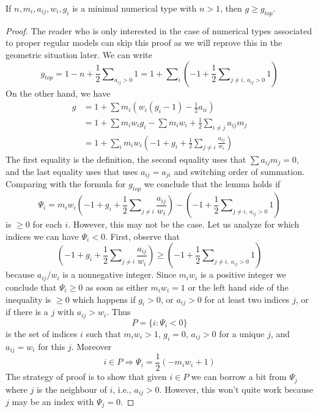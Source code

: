 %
\begin{lemma}
\label{lemma-genus-nonnegative}
If $n, m_i, a_{ij}, w_i, g_i$ is a minimal numerical type
with $n > 1$, then $g \geq g_{top}$.
\end{lemma}

\begin{proof}
The reader who is only interested in the case of numerical types
associated to proper regular models can skip this proof as we will
reprove this in the geometric situation later.
We can write
$$
g_{top} = 1 - n + \frac{1}{2}\sum\nolimits_{a_{ij} > 0} 1 =
1 + \sum\nolimits_i (-1 +
\frac{1}{2}\sum\nolimits_{j \not = i,\ a_{ij} > 0} 1) 
$$
On the other hand, we have
\begin{align*}
g & =
1 + \sum m_i(w_i(g_i - 1) - \frac{1}{2} a_{ii}) \\
& =
1 + \sum m_iw_ig_i - \sum m_iw_i +
\frac{1}{2} \sum\nolimits_{i \not = j} a_{ij}m_j \\
& =
1 + \sum\nolimits_i
m_iw_i(-1 + g_i + \frac{1}{2} \sum\nolimits_{j \not = i} \frac{a_{ij}}{w_i})
\end{align*}
The first equality is the definition, the second equality uses that
$\sum a_{ij}m_j = 0$, and the last equality uses that
uses $a_{ij} = a_{ji}$ and switching order of
summation. Comparing with the formula for $g_{top}$ we conclude
that the lemma holds if
$$
\Psi_i =
m_iw_i(-1 + g_i + \frac{1}{2} \sum\nolimits_{j \not = i} \frac{a_{ij}}{w_i})
- (-1 + \frac{1}{2}\sum\nolimits_{j \not = i,\ a_{ij} > 0} 1)
$$
is $\geq 0$ for each $i$. However, this may not be the case.
Let us analyze for which indices we can have $\Psi_i < 0$.
First, observe that
$$
(-1 + g_i + \frac{1}{2}\sum\nolimits_{j \not = i} \frac{a_{ij}}{w_i}) \geq
(-1 + \frac{1}{2}\sum\nolimits_{j \not = i,\ a_{ij} > 0} 1)
$$
because $a_{ij}/w_i$ is a nonnegative integer. Since $m_iw_i$ is
a positive integer we conclude that $\Psi_i \geq 0$ as soon as
either $m_iw_i = 1$ or the left hand side of the inequality is $\geq 0$
which happens if $g_i > 0$, or $a_{ij} > 0$ for at least two indices $j$, or
if there is a $j$ with $a_{ij} > w_i$. Thus
$$
P = \{i : \Psi_i < 0\}
$$
is the set of indices $i$ such that $m_iw_i > 1$, $g_i = 0$,
$a_{ij} > 0$ for a unique $j$, and $a_{ij} = w_i$ for this $j$.
Moreover
$$
i \in P \Rightarrow \Psi_i = \frac{1}{2}(-m_iw_i + 1)
$$
The strategy of proof is to show that given $i \in P$ we can borrow a bit
from $\Psi_j$ where $j$ is the neighbour of $i$, i.e., $a_{ij} > 0$.
However, this won't quite work because $j$ may be an index with $\Psi_j = 0$.


\end{proof}
